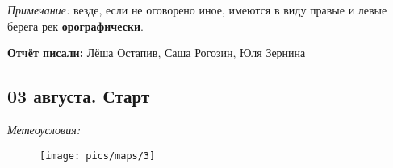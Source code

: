 \textit{Примечание:} везде, если не оговорено иное, имеются в виду правые и левые берега рек \textbf{орографически}.

\textbf{Отчёт писали:} Лёша Остапив, Саша Рогозин, Юля Зернина
\subsection{03 августа. Старт}
\textit{Метеоусловия: }

\begin{figure}[h!]
	\centering
	\texttt{[image: pics/maps/3]}
	\label{fig:mini_18}
\end{figure}



\clearpage